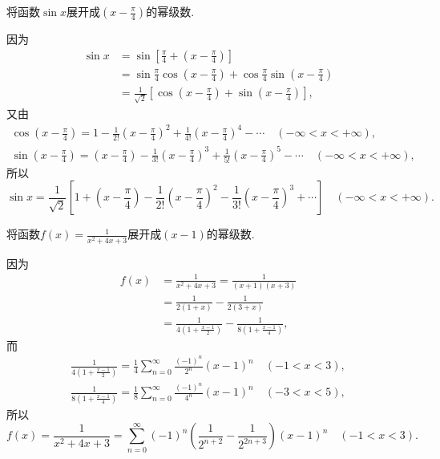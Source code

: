 \begin{example}
将函数\(\sin x\)展开成\(\left(x-\frac{\pi}{4}\right)\)的幂级数.
\begin{solution}
因为\begin{align*}
	\sin x &= \sin\left[\frac{\pi}{4}+\left(x-\frac{\pi}{4}\right)\right] \\
	&= \sin\frac{\pi}{4} \cos\left(x-\frac{\pi}{4}\right) + \cos\frac{\pi}{4} \sin\left(x-\frac{\pi}{4}\right) \\
	&= \frac{1}{\sqrt{2}} \left[\cos\left(x-\frac{\pi}{4}\right) + \sin\left(x-\frac{\pi}{4}\right)\right],
\end{align*}
又由\begin{gather*}
	\cos\left(x-\frac{\pi}{4}\right)
	= 1 - \frac{1}{2!} \left(x-\frac{\pi}{4}\right)^2 + \frac{1}{4!} \left(x-\frac{\pi}{4}\right)^4 - \dotsb
	\quad(-\infty < x < +\infty), \\
	\sin\left(x-\frac{\pi}{4}\right)
	= \left(x-\frac{\pi}{4}\right) - \frac{1}{3!} \left(x-\frac{\pi}{4}\right)^3 + \frac{1}{5!} \left(x-\frac{\pi}{4}\right)^5 - \dotsb
	\quad(-\infty < x < +\infty),
\end{gather*}
所以\begin{equation*}
	\sin x = \frac{1}{\sqrt{2}} \left[
	1 + \left(x-\frac{\pi}{4}\right)
	- \frac{1}{2!} \left(x-\frac{\pi}{4}\right)^2
	- \frac{1}{3!} \left(x-\frac{\pi}{4}\right)^3
	+ \dotsb
	\right]
	\quad(-\infty < x < +\infty).
\end{equation*}
\end{solution}
\end{example}

\begin{example}
将函数\(f(x) = \frac{1}{x^2+4x+3}\)展开成\((x-1)\)的幂级数.
\begin{solution}
因为\begin{align*}
	f(x) &= \frac{1}{x^2+4x+3}
	= \frac{1}{(x+1)(x+3)} \\
	&= \frac{1}{2(1+x)} - \frac{1}{2(3+x)} \\
	&= \frac{1}{4\left(1+\frac{x-1}{2}\right)}
	- \frac{1}{8\left(1+\frac{x-1}{4}\right)},
\end{align*}
而\begin{gather*}
	\frac{1}{4\left(1+\frac{x-1}{2}\right)}
	= \frac{1}{4} \sum_{n=0}^\infty \frac{(-1)^n}{2^n} (x-1)^n
	\quad(-1<x<3), \\
	\frac{1}{8\left(1+\frac{x-1}{4}\right)}
	= \frac{1}{8} \sum_{n=0}^\infty \frac{(-1)^n}{4^n} (x-1)^n
	\quad(-3<x<5),
\end{gather*}
所以\begin{equation*}
	f(x) = \frac{1}{x^2+4x+3}
	= \sum_{n=0}^\infty (-1)^n \left(\frac{1}{2^{n+2}}-\frac{1}{2^{2n+3}}\right) (x-1)^n
	\quad(-1<x<3).
\end{equation*}
\end{solution}
\end{example}

